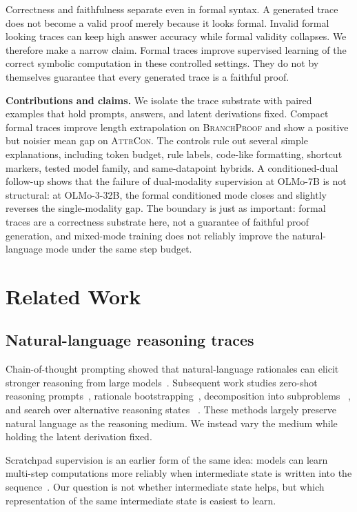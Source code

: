 \documentclass[11pt]{article}
\newcommand{\branchproof}{\textsc{BranchProof}}
\newcommand{\attrcon}{\textsc{AttrCon}}
\begin{document}
Correctness and faithfulness separate even in formal syntax. A generated trace
does not become a valid proof merely because it looks formal. Invalid
formal looking traces can keep high answer accuracy while formal validity
collapses. We therefore make a narrow claim. Formal traces improve supervised
learning of the correct symbolic computation in these controlled settings. They
do not by themselves guarantee that every generated trace is a faithful proof.

\textbf{Contributions and claims.} We isolate the trace substrate with paired
examples that hold prompts, answers, and latent derivations fixed. Compact
formal traces improve length extrapolation on \branchproof{} and show a
positive but noisier mean gap on \attrcon{}. The controls rule out several
simple explanations, including token budget, rule labels, code-like formatting,
shortcut markers, tested model family, and same-datapoint hybrids. A
conditioned-dual follow-up shows that the failure of dual-modality supervision
at OLMo-7B is not structural: at OLMo-3-32B, the formal conditioned mode closes
and slightly reverses the single-modality gap. The boundary is just as
important: formal traces are a correctness substrate here, not a guarantee of
faithful proof generation, and mixed-mode training does not reliably improve
the natural-language mode under the same step budget.

\section{Related Work}

\subsection{Natural-language reasoning traces}

Chain-of-thought prompting showed that natural-language rationales can elicit
stronger reasoning from large models~\citep{wei2022chain}. Subsequent work
studies zero-shot reasoning prompts~\citep{kojima2022large}, rationale
bootstrapping~\citep{zelikman2022star}, decomposition into subproblems
~\citep{zhou2023least}, and search over alternative reasoning states
~\citep{yao2023tree}. These methods largely preserve natural language as the
reasoning medium. We instead vary the medium while holding the latent derivation
fixed.

Scratchpad supervision is an earlier form of the same idea: models can learn
multi-step computations more reliably when intermediate state is written into
the sequence~\citep{nye2021show}. Our question is not whether intermediate
state helps, but which representation of the same intermediate state is easiest
to learn.
\end{document}
